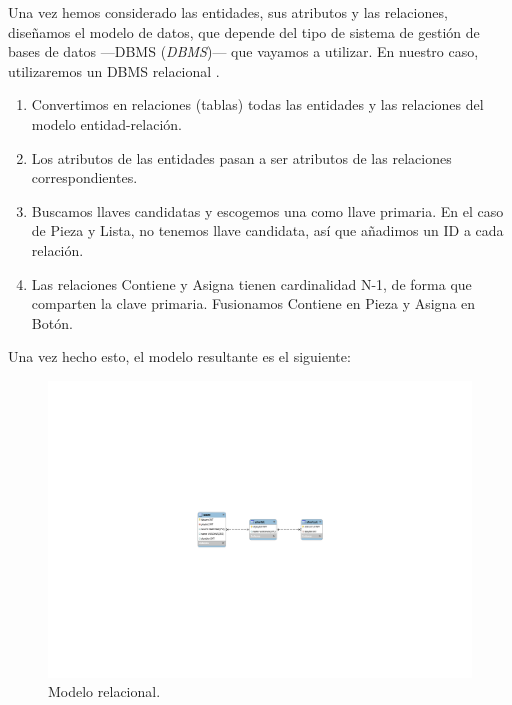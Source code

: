 Una vez hemos considerado las entidades, sus atributos y las relaciones, diseñamos el modelo de datos, que depende del tipo de sistema de gestión de bases de datos ---\acrshort{DBMS} (\textit{\acrlong{DBMS}})--- que vayamos a utilizar. En nuestro caso, utilizaremos un \acrshort{DBMS} relacional \cite{bdrel}.

\begin{enumerate}
	\item Convertimos en relaciones (tablas) todas las entidades y las relaciones del modelo entidad-relación.
	\item Los atributos de las entidades pasan a ser atributos de las relaciones correspondientes.
	\item Buscamos llaves candidatas y escogemos una como llave primaria. En el caso de Pieza y Lista, no tenemos llave candidata, así que añadimos un ID a cada relación.
	\item Las relaciones Contiene y Asigna tienen cardinalidad N-1, de forma que comparten la clave primaria. Fusionamos Contiene en Pieza y Asigna en Botón.
\end{enumerate}

Una vez hecho esto, el modelo resultante es el siguiente:

\smallskip

\begin{figure}[H]
	\noindent \begin{centering}
		\includegraphics[clip=true, trim=390 340 390 340, width=\linewidth*3/4]{capitulo4/bd_rel}
		\par\end{centering}
	\smallskip
	\caption{\label{fig:bd_rel} Modelo relacional.}
\end{figure} 

